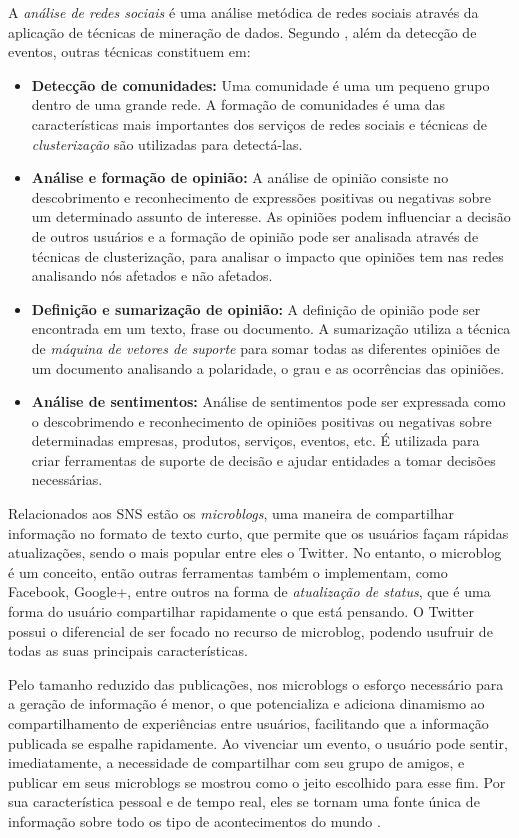 A \textit{análise de redes sociais} é uma análise metódica de redes sociais através da aplicação de técnicas de mineração de dados. Segundo , além da detecção de eventos, outras técnicas constituem em:

\begin{itemize}
	\item \textbf{Detecção de comunidades:} Uma comunidade é uma um pequeno grupo dentro de uma grande rede. A formação de comunidades é uma das características mais importantes dos serviços de redes sociais e técnicas de \textit{clusterização} são utilizadas para detectá-las.
	\item \textbf{Análise e formação de opinião:} A análise de opinião consiste no descobrimento e reconhecimento de expressões positivas ou negativas sobre um determinado assunto de interesse. As opiniões podem influenciar a decisão de outros usuários e a formação de opinião pode ser analisada através de técnicas de clusterização, para analisar o impacto que opiniões tem nas redes analisando nós afetados e não afetados.
	\item \textbf{Definição e sumarização de opinião:} A definição de opinião pode ser encontrada em um texto, frase ou documento. A sumarização utiliza a técnica de \textit{máquina de vetores de suporte} para somar todas as diferentes opiniões de um documento analisando a polaridade, o grau e as ocorrências das opiniões.
	\item \textbf{Análise de sentimentos:} Análise de sentimentos pode ser expressada como o descobrimendo e reconhecimento de opiniões positivas ou negativas sobre determinadas empresas, produtos, serviços, eventos, etc. É utilizada para criar ferramentas de suporte de decisão e ajudar entidades a tomar decisões necessárias.
\end{itemize}

Relacionados aos SNS estão os \textit{microblogs}, uma maneira de compartilhar informação no formato de texto curto, que permite que os usuários façam rápidas atualizações, sendo o mais popular entre eles o Twitter. No entanto, o microblog é um conceito, então outras ferramentas também o implementam, como Facebook, Google+, entre outros na forma de \textit{atualização de status}, que é uma forma do usuário compartilhar rapidamente o que está pensando. O Twitter possui o diferencial de ser focado no recurso de microblog, podendo usufruir de todas as suas principais características.

Pelo tamanho reduzido das publicações, nos microblogs o esforço necessário para a geração de informação é menor, o que potencializa e adiciona dinamismo ao compartilhamento de experiências entre usuários, facilitando que a informação publicada se espalhe rapidamente. Ao vivenciar um evento, o usuário pode sentir, imediatamente, a necessidade de compartilhar com seu grupo de amigos, e publicar em seus microblogs se mostrou como o jeito escolhido para esse fim. Por sua característica pessoal e de tempo real, eles se tornam uma fonte única de informação sobre todo os tipo de acontecimentos do mundo \cite{Mai2012}. 

